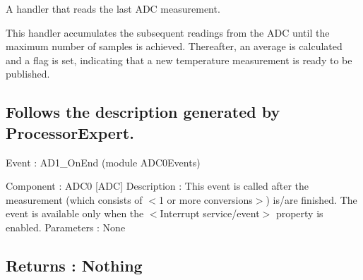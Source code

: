 A handler that reads the last A\+DC measurement. 

This handler accumulates the subsequent readings from the A\+DC until the maximum number of samples is achieved. Thereafter, an average is calculated and a flag is set, indicating that a new temperature measurement is ready to be published.

\subsection*{Follows the description generated by Processor\+Expert. }

Event \+: A\+D1\+\_\+\+On\+End (module A\+D\+C0\+Events)

Component \+: A\+D\+C0 \mbox{[}A\+DC\mbox{]} Description \+: This event is called after the measurement (which consists of $<$1 or more conversions$>$) is/are finished. The event is available only when the $<$Interrupt service/event$>$ property is enabled. Parameters \+: None \subsection*{Returns \+: Nothing }